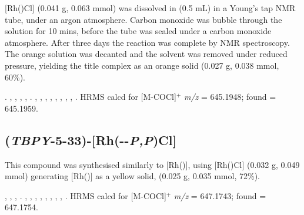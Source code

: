 [Rh(\tBusixantphos)Cl] (0.041 g, 0.063 mmol) was dissolved in  (0.5 mL) in a Young's tap NMR tube, under an argon atmosphere.  Carbon monoxide was bubble through the solution for 10 mins, before the tube was sealed under a carbon monoxide atmosphere.  After three days the reaction was complete by \phosphorus{} NMR spectroscopy.  The orange solution was decanted and the solvent was removed under reduced pressure, yielding the title complex as an orange solid (0.027 g, 0.038 mmol, 60\%). 

.
,
,
,
,
.
,
,
,
,
,
,
,
,
.
HRMS calcd for  [M-COCl]$^+$ \emph{m/z} = 645.1948; found = 645.1959.



\subsection*{(\emph{TBPY}-5-33)-[Rh(\tButhixantphos--\emph{P,P}\textprime)Cl]}


This compound was synthesised similarly to [Rh(\tBusixantphos)], using [Rh(\tButhixantphos)Cl] (0.032 g, 0.049 mmol) generating [Rh(\tButhixantphos)] as a yellow solid, (0.025 g, 0.035 mmol, 72\%).  

,
,
,
.
,
,
,
,
,
,
,
,
.
HRMS calcd for  [M-COCl]$^+$ \emph{m/z} = 647.1743; found = 647.1754.


